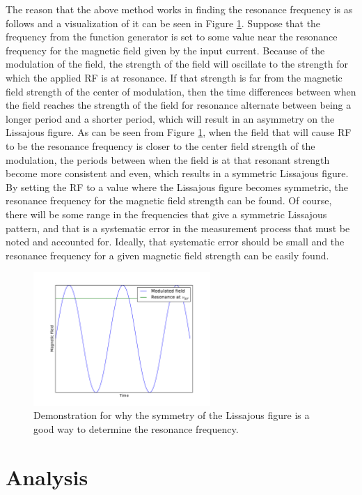 \documentclass[11pt,letterpaper]{article}
\begin{document}
The reason that the above method works in finding the resonance frequency is as
follows and a visualization of it can be seen in Figure \ref{resdemo}. Suppose
that the frequency from the function generator is set to some value near the
resonance frequency for the magnetic field given by the input current. Because
of the modulation of the field, the strength of the field will oscillate to the
strength for which the applied RF is at resonance. If that strength is far from
the magnetic field strength of the center of modulation, then the time
differences between when the field reaches the strength of the field for
resonance alternate between being a longer period and a shorter period, which
will result in an asymmetry on the Lissajous figure. As can be seen from Figure
\ref{resdemo}, when the field that will cause RF to be the resonance frequency
is closer to the center field strength of the modulation, the periods between
when the field is at that resonant strength become more consistent and even,
which results in a symmetric Lissajous figure. By setting the RF to a value
where the Lissajous figure becomes symmetric, the resonance frequency for the
magnetic field strength can be found. Of course, there will be some range in the
frequencies that give a symmetric Lissajous pattern, and that is a systematic
error in the measurement process that must be noted and accounted for. Ideally,
that systematic error should be small and the resonance frequency for a given
magnetic field strength can be easily found.

\begin{figure}
    \centering
    \includegraphics[width=0.6\textwidth]{figures/resonance_demo.pdf}
    \caption{Demonstration for why the symmetry of the Lissajous figure is a
    good way to determine the resonance frequency.}
    \label{resdemo}
\end{figure}

\section{Analysis}
\end{document}
